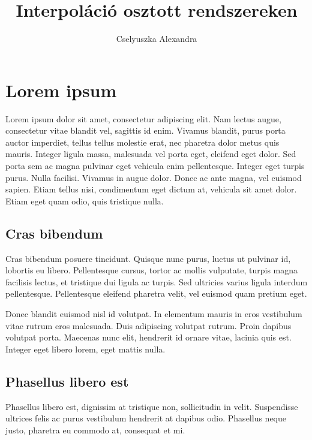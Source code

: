 \documentclass{elteikthesis}
\title{Interpoláció osztott rendszereken}
\author{Cselyuszka Alexandra}
\begin{document}
\frontmatter

	\maketitle
	\tableofcontents
	
\mainmatter

\chapter{Lorem ipsum} 
Lorem ipsum dolor sit amet, consectetur adipiscing elit. Nam lectus augue, 
consectetur vitae blandit vel, sagittis id enim. Vivamus blandit, purus porta 
auctor imperdiet, tellus tellus molestie erat, nec pharetra dolor metus quis 
mauris. Integer ligula massa, malesuada vel porta eget, eleifend eget dolor. 
Sed porta sem ac magna pulvinar eget vehicula enim pellentesque. Integer eget 
turpis purus. Nulla facilisi. Vivamus in augue dolor. Donec ac ante magna, 
vel euismod sapien. Etiam tellus nisi, condimentum eget dictum at, vehicula 
sit amet dolor. Etiam eget quam odio, quis tristique nulla.

\section{Cras bibendum} 
Cras bibendum posuere tincidunt. Quisque nunc purus, luctus ut pulvinar id, 
lobortis eu libero. Pellentesque cursus, tortor ac mollis vulputate, turpis 
magna facilisis lectus, et tristique dui ligula ac turpis. Sed ultricies 
varius ligula interdum pellentesque. Pellentesque eleifend pharetra velit, 
vel euismod quam pretium eget. 

Donec blandit euismod nisl id volutpat. In 
elementum mauris in eros vestibulum vitae rutrum eros malesuada. Duis 
adipiscing volutpat rutrum. Proin dapibus volutpat porta. Maecenas nunc elit, 
hendrerit id ornare vitae, lacinia quis est. Integer eget libero lorem, eget 
mattis nulla. 

\section{Phasellus libero est} 
Phasellus libero est, dignissim at tristique non, sollicitudin in velit. 
Suspendisse ultrices felis ac purus vestibulum hendrerit at dapibus odio. 
Phasellus neque justo, pharetra eu commodo at, consequat et mi. 
\end{document}
